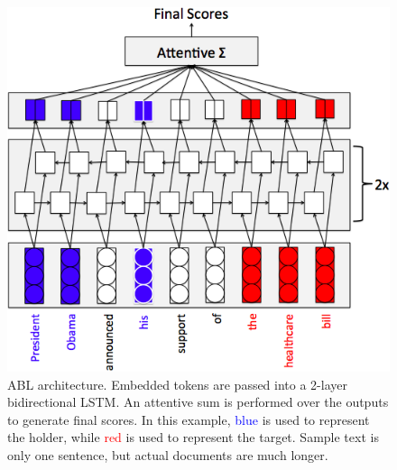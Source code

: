 \documentclass[11pt,a4paper]{article}
\begin{document}
\begin{figure} \label{fig:model1}
\centering
\includegraphics[scale=0.4]{base.png}
\caption{ABL architecture. Embedded tokens are passed into a 2-layer bidirectional LSTM. An attentive sum is performed over the outputs to generate final scores. In this example, \textcolor{blue}{blue} is used to represent the holder, while \textcolor{red}{red} is used to represent the target. Sample text is only one sentence, but actual documents are much longer.}
\end{figure}
\end{document}
